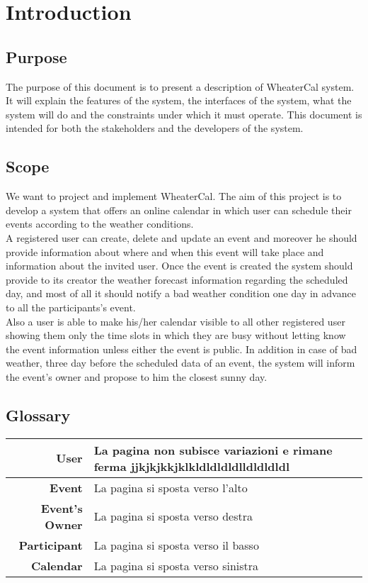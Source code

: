 \chapter{Introduction} \label{cap:cap1}

\section{Purpose}
The purpose of this document is to present a description of WheaterCal system. It will explain the features of the system, the interfaces of the system, what the system will do and the constraints under which it must operate.
This document is intended for both the stakeholders and the developers of the system.

\section{Scope}
We want to project and implement WheaterCal. The aim of this project is to develop a system that offers an online calendar in which user can schedule their events according to the weather conditions.\\ A registered user can create, delete and update an event and moreover he should provide information about where and when this event will take place and information about the invited user.
Once the event is created the system should provide to its creator the weather forecast information regarding the scheduled day, and most of all it should notify a bad weather condition one day in advance to all the participants's event.\\
Also a user is able to make his/her calendar visible to all other registered user showing them only the time slots in which they are busy without letting know the event information unless either the event is public.
In addition in case of bad weather, three day before the scheduled data of an event, the system will inform the event's owner and propose to him the closest sunny day.

\section{Glossary}

\begin{tabular}{|r|l|}
  \hline  {\bf User} & La pagina non subisce variazioni e rimane ferma jjkjkjkkjklkldldldldlldldldldl\\ 
  \hline  {\bf Event} & La pagina si sposta verso l'alto \\ 
  \hline  {\bf Event's Owner} & La pagina si sposta verso destra\\
  \hline  {\bf Participant}&  La pagina si sposta verso il basso\\
  \hline  {\bf Calendar} & La pagina si sposta verso sinistra\\ \hline
\end{tabular}

